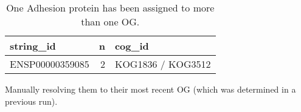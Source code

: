 \begin{Shaded}
\end{Shaded}

\begin{table}[H]

\caption{\label{tab:unnamed-chunk-8}One Adhesion protein has been assigned to more than one OG.}
\begin{tabular}[t]{lrl}
\toprule
string\_id & n & cog\_id\\
\midrule
\rowcolor{gray!6}  ENSP00000359085 & 2 & KOG1836 / KOG3512\\
\bottomrule
\end{tabular}
\end{table}

Manually resolving them to their most recent OG (which was determined in
a previous run).

